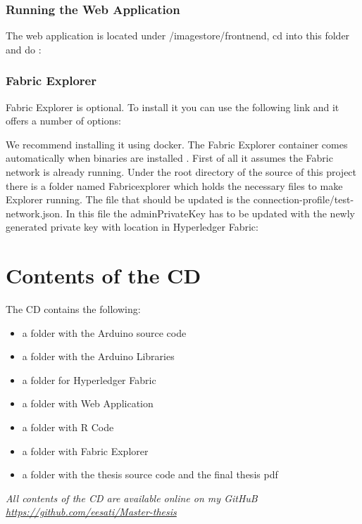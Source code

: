 \subsection{Running the Web Application}

The web application is located under {\selectfont /imagestore/frontnend}, cd into this folder and do : 

\subsection{Fabric Explorer}
Fabric Explorer is optional. To install it you can use the following link and it offers a number of options: 


We recommend installing it using docker. The Fabric Explorer container comes automatically when binaries are installed . First of all it assumes the Fabric network is already running. Under the root directory of the source of this project there is a folder named {\selectfont Fabricexplorer} which holds the necessary files to make Explorer running. The file that should be updated is the {\selectfont connection-profile/test-network.json}. In this file the {\selectfont adminPrivateKey} has to be updated with the newly generated private key with location in Hyperledger Fabric: 






\chapter{Contents of the CD}
The CD contains the following:

\begin{itemize}
    \item a folder with the Arduino source code
    \item a folder with the Arduino Libraries
    \item a folder for Hyperledger Fabric
    \item a folder with Web Application
    \item a folder with R Code
    \item a folder with Fabric Explorer
    \item a folder with the thesis source code and the final thesis pdf
 
\end{itemize}

\emph{All contents of the CD are available online on my GitHuB \url{https://github.com/eesati/Master-thesis}}




%

